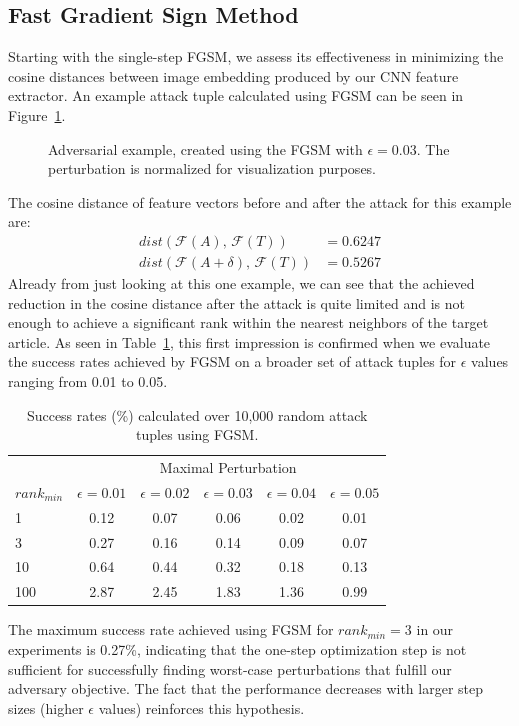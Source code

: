 \subsection{Fast Gradient Sign Method}
Starting with the single-step \acl{FGSM}, we assess its effectiveness in minimizing the cosine distances between image embedding produced by our \ac{CNN} feature extractor. An example attack tuple calculated using \ac{FGSM} can be seen in Figure~\ref{fig:fgsm-example}. 
\begin{figure}[H]
	\centering
	
	\caption{Adversarial example, created using the \acs{FGSM} with $\epsilon = 0.03$. The perturbation is normalized for visualization purposes.}
	\label{fig:fgsm-example}
\end{figure}
The cosine distance of feature vectors before and after the attack for this example are:
\begin{align}
dist(\mathcal{F}(A),\,\mathcal{F}(T)) &= 0.6247 \\
dist(\mathcal{F}(A + \delta),\,\mathcal{F}(T)) &= 0.5267
\end{align}
Already from just looking at this one example, we can see that the achieved reduction in the cosine distance after the attack is quite limited and is not enough to achieve a significant rank within the nearest neighbors of the target article. As seen in Table~\ref{tab:fgsm-results}, this first impression is confirmed when we evaluate the success rates achieved by \ac{FGSM} on a broader set of attack tuples for $\epsilon$ values ranging from 0.01 to 0.05.
\begin{table}[H]
	\centering
	\begin{tabular}{ lccccc } 
		\toprule		
		& \multicolumn{5}{c}{Maximal Perturbation} \\
		\cmidrule{2-6}
		$rank_{min}$ & $\epsilon = 0.01$ & $\epsilon = 0.02$ & $\epsilon = 0.03$  & $\epsilon = 0.04$ & $\epsilon = 0.05$  \\
		\midrule
		1 & 0.12 & 0.07 & 0.06 & 0.02 & 0.01 \\
		3 & 0.27 & 0.16 & 0.14 & 0.09 & 0.07 \\
		10 & 0.64 & 0.44 & 0.32 & 0.18 & 0.13 \\
		100 & 2.87 & 2.45 & 1.83 & 1.36 & 0.99 \\
		\bottomrule
	\end{tabular}
	\caption{Success rates (\%) calculated over 10,000 random attack tuples using \acs{FGSM}.}
	\label{tab:fgsm-results}
\end{table}
The maximum success rate achieved using \ac{FGSM} for $rank_{min}=3$ in our experiments is 0.27\%, indicating that the one-step optimization step is not sufficient for successfully finding worst-case perturbations  that fulfill our adversary objective. The fact that the performance decreases with larger step sizes (higher $\epsilon$ values) reinforces this hypothesis.

